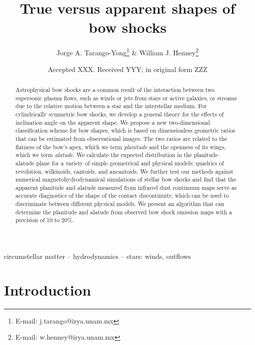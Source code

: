 \documentclass[useAMS, usenatbib, a4paper]{mnras}
\title[Bow shock shapes]{True versus apparent shapes of bow shocks}
\author[Tarango-Yong \& Henney]{
  Jorge A. Tarango-Yong\thanks{E-mail: j.tarango@irya.unam.mx}
  \& William J. Henney\thanks{E-mail: w.henney@irya.unam.mx}\\
  \AddressCRyA
}
\date{Accepted XXX. Received YYY; in original form ZZZ}
\begin{document}
\label{firstpage}
\pagerange{\pageref{firstpage}--\pageref{lastpage}}
\maketitle
\begin{abstract}
  Astrophysical bow shocks are a common result of the interaction
  between two supersonic plasma flows, such as winds or jets from
  stars or active galaxies, or streams due to the relative motion
  between a star and the interstellar medium.
  For cylindrically symmetric bow shocks, we develop a general theory
  for the effects of inclination angle on the apparent shape. We
  propose a new two-dimensional classification scheme for bow shapes,
  which is based on dimensionless geometric ratios that can be
  estimated from observational images.  The two ratios are related to
  the flatness of the bow's apex, which we term \textit{planitude} and
  the openness of its wings, which we term \textit{alatude}.  We
  calculate the expected distribution in the planitude--alatude plane
  for a variety of simple geometrical and physical models: quadrics of
  revolution, wilkinoids, cantoids, and ancantoids.  We further test
  our methods against numerical magnetohydrodynamical simulations of
  stellar bow shocks and find that the apparent planitude and alatude
  measured from infrared dust continuum maps serve as accurate
  diagnostics of the shape of the contact discontinuity, which can be
  used to discriminate between different physical models.  We present
  an algorithm that can determine the planitude and alatude from observed
  bow shock emission maps with a precision of 10 to 20\%. 
\end{abstract}

\begin{keywords}
  circumstellar matter -- hydrodynamics -- stars: winds, outflows
\end{keywords}


\section{Introduction}
\label{sec:intro}


\end{document}
